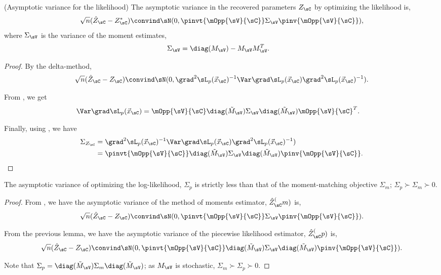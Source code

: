 \begin{lemma}(Asymptotic variance for the likelihood)
  \label{lem:pw-variance}
  The asymptotic variance in the recovered parameters $Z_{\sC}$ by optimizing the likelihood is,
  \begin{align*}
    \sqrt{n}(\hat Z_{\sC} - Z_{\sC}^*) \convind \sN( 0, \pinvt{\mOpp{\sV}{\sC}} \Sigma_\sV \pinv{\mOpp{\sV}{\sC}} ),
  \end{align*}
  where $\Sigma_\sV$ is the variance of the moment estimates, 
  \begin{align*}
    \Sigma_\sV &= \diag(M_\sV) - M_\sV M_\sV^T.
  \end{align*}
\end{lemma}
\begin{proof}
  By the delta-method, 
  \begin{align*}
    \sqrt{n}(\hat Z_{\sC} - Z_{\sC}) \convind \sN( 0, \grad^2 \sL_p(\vec x_\sC)^{-1} \Var \grad \sL_p(\vec x_\sC)\grad^2 \sL_p(\vec x_\sC)^{-1}).
  \end{align*}

  From , we get
  \begin{align*}
    \Var \grad \sL_p(\vec x_\sC) &= \mOpp{\sV}{\sC} \diag(\tilde M_\sV) \Sigma_\sV \diag(\tilde M_\sV) \mOpp{\sV}{\sC}^T .
  \end{align*}

  Finally, using , we have
  \begin{align*}
    \Sigma_{Z_\sC} 
      &= \grad^2 \sL_p(\vec x_\sC)^{-1} \Var \grad \sL_p(\vec x_\sC)\grad^2 \sL_p(\vec x_\sC)^{-1}) \\
      &= \pinvt{\mOpp{\sV}{\sC}} \diag(\tilde M_\sV) \Sigma_\sV \diag(\tilde M_\sV) \pinv{\mOpp{\sV}{\sC}}.
  \end{align*}
\end{proof}

\begin{corollary}
  The asymptotic variance of optimizing the log-likelihood, $\Sigma_p$
  is strictly less than that of the moment-matching objective
  $\Sigma_m$; $\Sigma_p \succ \Sigma_m \succ 0$.
\end{corollary}
\begin{proof}
  From , we have the asymptotic variance of the method of moments estimator, $\hat Z_\sC^(m)$ is,
  \begin{align*}
    \sqrt{n}(\hat Z_\sC - Z_\sC) \convind \sN(0, \pinvt{\mOpp{\sV}{\sC}} \Sigma_\sV \pinv{\mOpp{\sV}{\sC}}).
  \end{align*}

  From the previous lemma, we have the asymptotic variance of the piecewise likelihood estimator, $\hat Z_\sC^(p)$ is,
  \begin{align*}
    \sqrt{n}(\hat Z_{\sC} - Z_{\sC}) \convind \sN( 0, \pinvt{\mOpp{\sV}{\sC}} \diag(\tilde M_\sV) \Sigma_\sV \diag(\tilde M_\sV) \pinv{\mOpp{\sV}{\sC}} ).
  \end{align*}

  Note that $\Sigma_p = \diag(\tilde M_\sV) \Sigma_m \diag(\tilde M_\sV)$; as $M_\sV$ is stochastic, $\Sigma_m \succ \Sigma_p \succ 0$. 
\end{proof}

